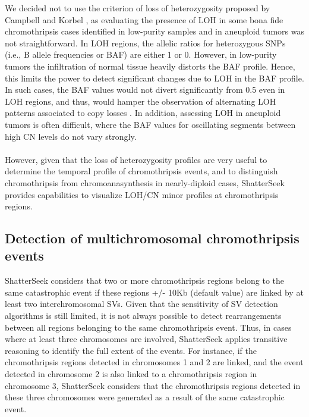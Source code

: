 \documentclass[twoside,a4wide,11pt]{article}\usepackage[]{graphicx}\usepackage[]{color}
\begin{document}
We decided not to use the criterion of loss of heterozygosity proposed by Campbell and Korbel \cite{Korbel2013}, 
as evaluating the presence of LOH in some bona fide chromothripsis cases identified in low-purity samples and
in aneuploid tumors was not straightforward.
In LOH regions, the allelic ratios for heterozygous SNPs (i.e., B allele frequencies or BAF) are either 1 or 0.
However, in low-purity tumors %
the infiltration of normal tissue heavily distorts the BAF profile.
Hence, this limits the power to detect significant changes due to LOH in the BAF profile. 
In such cases, the BAF values would not divert significantly from 0.5 even in LOH regions, and thus, would hamper the observation of alternating LOH patterns associated to copy losses \cite{Song2012}.
In addition, assessing LOH in aneuploid tumors is often difficult,
where the BAF values for oscillating segments between high CN levels do not vary strongly.\\
\\
However, given that the loss of heterozygosity profiles are very useful to
determine the temporal profile of chromothripsis events, 
and to distinguish chromothripsis from chromoanasynthesis in nearly-diploid cases,
ShatterSeek provides capabilities to visualize LOH/CN minor profiles at chromothripsis regions.
\\

\subsection{Detection of multichromosomal chromothripsis events}
ShatterSeek considers that two or more  chromothripsis regions belong to the same 
catastrophic event if these regions +/- 10Kb (default value) are linked by at least two interchromosomal SVs.
Given that the sensitivity of SV detection algorithms is still limited,
it is not always possible to detect rearrangements between all regions belonging to the same chromothripsis event.
Thus, in cases where at least three chromosomes are involved, 
ShatterSeek applies transitive reasoning to identify the full extent of the events. 
For instance, if the chromothripsis regions detected in chromosomes 1 and 2 are linked, and the event detected in chromosome 2 is also linked to a chromothripsis region in chromosome 3, ShatterSeek considers that the chromothripsis regions detected in these three chromosomes were generated as a result of the same catastrophic event.
\end{document}
